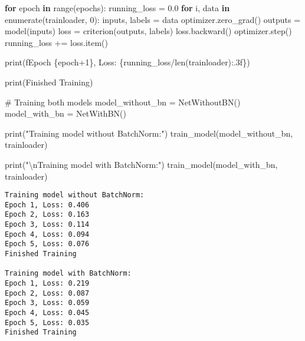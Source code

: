 \documentclass[
  letterpaper,
  DIV=11,
  numbers=noendperiod]{scrreprt}
\newenvironment{Shaded}{\begin{snugshade}}{\end{snugshade}}
\newcommand{\BuiltInTok}[1]{\textcolor[rgb]{0.00,0.23,0.31}{#1}}
\newcommand{\CharTok}[1]{\textcolor[rgb]{0.13,0.47,0.30}{#1}}
\newcommand{\CommentTok}[1]{\textcolor[rgb]{0.37,0.37,0.37}{#1}}
\newcommand{\ControlFlowTok}[1]{\textcolor[rgb]{0.00,0.23,0.31}{\textbf{#1}}}
\newcommand{\DecValTok}[1]{\textcolor[rgb]{0.68,0.00,0.00}{#1}}
\newcommand{\FloatTok}[1]{\textcolor[rgb]{0.68,0.00,0.00}{#1}}
\newcommand{\KeywordTok}[1]{\textcolor[rgb]{0.00,0.23,0.31}{\textbf{#1}}}
\newcommand{\NormalTok}[1]{\textcolor[rgb]{0.00,0.23,0.31}{#1}}
\newcommand{\OperatorTok}[1]{\textcolor[rgb]{0.37,0.37,0.37}{#1}}
\newcommand{\SpecialCharTok}[1]{\textcolor[rgb]{0.37,0.37,0.37}{#1}}
\newcommand{\SpecialStringTok}[1]{\textcolor[rgb]{0.13,0.47,0.30}{#1}}
\newcommand{\StringTok}[1]{\textcolor[rgb]{0.13,0.47,0.30}{#1}}
\begin{document}
\begin{Shaded}
\begin{Highlighting}[]
    \ControlFlowTok{for}\NormalTok{ epoch }\KeywordTok{in} \BuiltInTok{range}\NormalTok{(epochs):}
\NormalTok{        running\_loss }\OperatorTok{=} \FloatTok{0.0}
        \ControlFlowTok{for}\NormalTok{ i, data }\KeywordTok{in} \BuiltInTok{enumerate}\NormalTok{(trainloader, }\DecValTok{0}\NormalTok{):}
\NormalTok{            inputs, labels }\OperatorTok{=}\NormalTok{ data}
\NormalTok{            optimizer.zero\_grad()}
\NormalTok{            outputs }\OperatorTok{=}\NormalTok{ model(inputs)}
\NormalTok{            loss }\OperatorTok{=}\NormalTok{ criterion(outputs, labels)}
\NormalTok{            loss.backward()}
\NormalTok{            optimizer.step()}
\NormalTok{            running\_loss }\OperatorTok{+=}\NormalTok{ loss.item()}
            
        \BuiltInTok{print}\NormalTok{(}\SpecialStringTok{f\textquotesingle{}Epoch }\SpecialCharTok{\{}\NormalTok{epoch}\OperatorTok{+}\DecValTok{1}\SpecialCharTok{\}}\SpecialStringTok{, Loss: }\SpecialCharTok{\{}\NormalTok{running\_loss}\OperatorTok{/}\BuiltInTok{len}\NormalTok{(trainloader)}\SpecialCharTok{:.3f\}}\SpecialStringTok{\textquotesingle{}}\NormalTok{)}
    
    \BuiltInTok{print}\NormalTok{(}\StringTok{\textquotesingle{}Finished Training\textquotesingle{}}\NormalTok{)}

\CommentTok{\# Training both models}
\NormalTok{model\_without\_bn }\OperatorTok{=}\NormalTok{ NetWithoutBN()}
\NormalTok{model\_with\_bn }\OperatorTok{=}\NormalTok{ NetWithBN()}

\BuiltInTok{print}\NormalTok{(}\StringTok{"Training model without BatchNorm:"}\NormalTok{)}
\NormalTok{train\_model(model\_without\_bn, trainloader)}

\BuiltInTok{print}\NormalTok{(}\StringTok{"}\CharTok{\textbackslash{}n}\StringTok{Training model with BatchNorm:"}\NormalTok{)}
\NormalTok{train\_model(model\_with\_bn, trainloader)}
\end{Highlighting}
\end{Shaded}

\begin{verbatim}
Training model without BatchNorm:
Epoch 1, Loss: 0.406
Epoch 2, Loss: 0.163
Epoch 3, Loss: 0.114
Epoch 4, Loss: 0.094
Epoch 5, Loss: 0.076
Finished Training

Training model with BatchNorm:
Epoch 1, Loss: 0.219
Epoch 2, Loss: 0.087
Epoch 3, Loss: 0.059
Epoch 4, Loss: 0.045
Epoch 5, Loss: 0.035
Finished Training
\end{verbatim}
\end{document}
